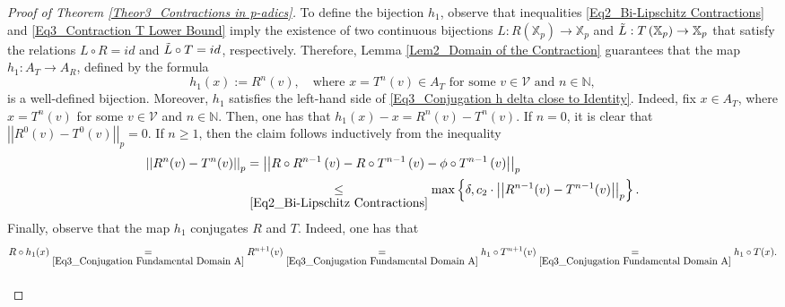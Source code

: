 \documentclass[10pt,a4paper]{amsart}
\begin{document}
\begin{proof}[Proof of Theorem \ref{Theor3_Contractions in p-adics}]
		To define the bijection $h_{1}$, observe that inequalities \eqref{Eq2_Bi-Lipschitz Contractions} and \eqref{Eq3_Contraction T Lower Bound} imply the existence of two continuous bijections $L: R \left(  \mathbb{X}_{p}  \right)  \to \mathbb{X}_{p}$ and $\Tilde{L}: T \left(  \mathbb{X}_{p}  \right)  \to \mathbb{X}_{p}$ that satisfy the relations $L \circ R = id$ and $ \Tilde{L} \circ T = id$, respectively. Therefore, Lemma \ref{Lem2_Domain of the Contraction} guarantees that the map $h_{1}: A_{T} \to A_{R}$, defined by the formula  
		\begin{equation}\label{Eq3_Conjugation Fundamental Domain A}
			h_{1} \left(  x  \right)   :=   R^{n} \left(  v  \right) , \quad \text{where } x = T^{n} \left(  v  \right)  \in A_{T}   \text{ for some } v \in \mathcal{V} \text{ and } n \in  \mathbb{N} ,   
		\end{equation} 
		is a well-defined bijection. 
		Moreover, $h_{1}$  satisfies the left-hand side of \eqref{Eq3_Conjugation h delta close to Identity}. Indeed, fix $ x \in A_{T}$, where $x = T^{n} \left(  v  \right) $ for some $v \in \mathcal{V}$ and $n \in \mathbb{N} $. Then, one has that $h_{1}(x) - x = R^{n}(v) - T^{n}(v)$. 
		If $n=0$, it is clear that $ \left| \left|  R^{0}(v) - T^{0}(v)  \right|  \right|_{p} = 0$. If $n \ge 1$, then the claim follows inductively from the inequality 
		\begin{align*}
			\left| \left|  R^{n}(v) - T^{n}(v)  \right|  \right|_{p}   & =    \left| \left|  R\circ R^{n-1} \left(  v  \right)  - R\circ T^{n-1} \left(  v  \right)  - \phi\circ T^{n-1} \left(  v  \right)   \right|  \right|_{p} \\ 
			& \underset{\eqref{Eq2_Bi-Lipschitz Contractions}}{\le}   \max \left\{  \delta, c_{2}\cdot  \left| \left|  R^{n-1}(v) - T^{n-1}(v)  \right|  \right|_{p}  \right\}  .
		\end{align*}
		Finally, observe that the map $h_{1}$ conjugates $R$ and $T$. Indeed, one has that  
		\begin{equation}\label{Eq3_Homeomorphism 1 Conjugation}
			R\circ h_{1}(x)    \underset{\eqref{Eq3_Conjugation Fundamental Domain A}}{=}    R^{n+1}(v)    \underset{\eqref{Eq3_Conjugation Fundamental Domain A}}{=}    h_{1}\circ T^{n+1}(v)    \underset{\eqref{Eq3_Conjugation Fundamental Domain A}}{=}    h_{1}\circ T(x) .
		\end{equation}
		
		
		
		\paragraph{} 
		

\end{proof}
\end{document}
